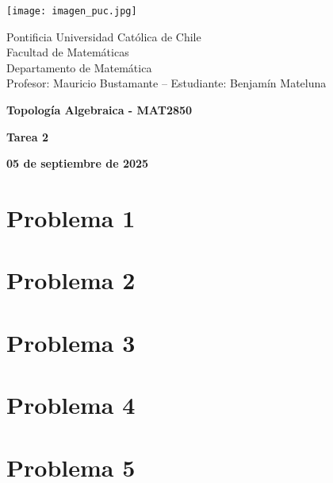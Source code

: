 \documentclass{article}
\begin{document}
\begin{minipage}{2.5cm}
    \texttt{[image: imagen\_puc.jpg]}
\end{minipage}
\begin{minipage}{14cm}
    {\sc Pontificia Universidad Católica de Chile\\
    Facultad de Matemáticas\\
    Departamento de Matemática\\
    Profesor: Mauricio Bustamante -- Estudiante: Benjamín Mateluna}
\end{minipage}
\vspace{1ex}

{\centerline{\bf Topología Algebraica - MAT2850}
\centerline{\bf Tarea 2}}
\centerline{\bf 05 de septiembre de 2025}

\section*{Problema 1}

\section*{Problema 2}

\section*{Problema 3}

\section*{Problema 4}

\section*{Problema 5}

\end{document}
